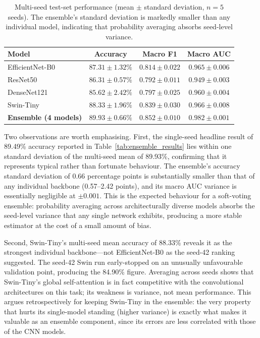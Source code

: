 \begin{table}[H]
\centering
\caption{Multi-seed test-set performance (mean $\pm$ standard deviation, $n=5$ seeds). The ensemble's standard deviation is markedly smaller than any individual model, indicating that probability averaging absorbs seed-level variance.}
\label{tab:multiseed}
\begin{tabular}{lccc}
\toprule
\textbf{Model} & \textbf{Accuracy} & \textbf{Macro F1} & \textbf{Macro AUC} \\
\midrule
EfficientNet-B0  & $87.31 \pm 1.32\%$ & $0.814 \pm 0.022$ & $0.965 \pm 0.006$ \\
ResNet50         & $86.31 \pm 0.57\%$ & $0.792 \pm 0.011$ & $0.949 \pm 0.003$ \\
DenseNet121      & $85.62 \pm 2.42\%$ & $0.797 \pm 0.025$ & $0.960 \pm 0.004$ \\
Swin-Tiny        & $88.33 \pm 1.96\%$ & $0.839 \pm 0.030$ & $0.966 \pm 0.008$ \\
\midrule
\textbf{Ensemble (4 models)} & $\mathbf{89.93 \pm 0.66\%}$ & $\mathbf{0.852 \pm 0.010}$ & $\mathbf{0.982 \pm 0.001}$ \\
\bottomrule
\end{tabular}
\end{table}

Two observations are worth emphasising. First, the single-seed headline result of 89.49\% accuracy reported in Table~\ref{tab:ensemble_results} lies within one standard deviation of the multi-seed mean of 89.93\%, confirming that it represents typical rather than fortunate behaviour. The ensemble's accuracy standard deviation of 0.66 percentage points is substantially smaller than that of any individual backbone (0.57--2.42 points), and its macro AUC variance is essentially negligible at $\pm 0.001$. This is the expected behaviour for a soft-voting ensemble: probability averaging across architecturally diverse models absorbs the seed-level variance that any single network exhibits, producing a more stable estimator at the cost of a small amount of bias.

Second, Swin-Tiny's multi-seed mean accuracy of 88.33\% reveals it as the strongest individual backbone---not EfficientNet-B0 as the seed-42 ranking suggested. The seed-42 Swin run early-stopped on an unusually unfavourable validation point, producing the 84.90\% figure. Averaging across seeds shows that Swin-Tiny's global self-attention is in fact competitive with the convolutional architectures on this task; its weakness is variance, not mean performance. This argues retrospectively for keeping Swin-Tiny in the ensemble: the very property that hurts its single-model standing (higher variance) is exactly what makes it valuable as an ensemble component, since its errors are less correlated with those of the CNN models.

